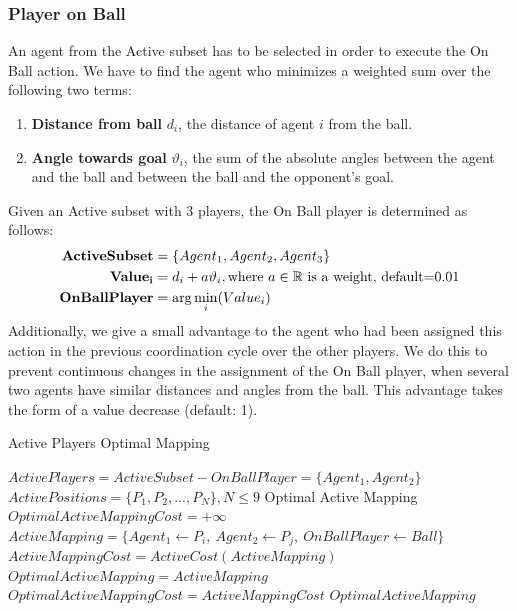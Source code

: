 \subsubsection*{Player on Ball}
An agent from the Active subset has to be selected in order to execute the On Ball action. We have to find the agent who minimizes a weighted sum over the following two terms:
\begin{enumerate}
\item \textbf{Distance from ball} $d_{i}$, the distance of agent $i$ from the ball. 
\item \textbf{Angle towards goal} $\vartheta_{i}$, the sum of the absolute angles between the agent and the ball and between the ball and the opponent's goal.
\end{enumerate}
Given an Active subset with 3 players, the On Ball player is determined as follows:
\begin{align*}
{\bf ActiveSubset} &= \lbrace Agent_{1},Agent_{2},Agent_{3} \rbrace  \\
{\bf Value_{i}} &= d_{i} + a \vartheta_{i}, \text{where $a\in\mathbb{R}$ is a weight, default=$0.01$} \\
{\bf OnBallPlayer} &= \arg\min_{i}(Value_{i})
\end{align*}
Additionally, we give a small advantage to the agent who had been assigned this action in the previous coordination cycle over the other players. We do this to prevent continuous changes in the assignment of the On Ball player, when several two agents have similar distances and angles from the ball. This advantage takes the form of a value decrease (default: 1).


\begin{algorithm}[t!]
\caption{Active Players Optimal Mapping}
\label{ActiveMapping}
\begin{algorithmic}[1]
$ActivePlayers = ActiveSubset - OnBallPlayer = \{Agent_1,Agent_2\}$
$ActivePositions = \lbrace P_{1},P_{2},...,P_{N} \rbrace, N\leq 9 $
Optimal Active Mapping
\STATE 
\STATE $OptimalActiveMappingCost = +\infty$
\STATE $ActiveMapping = \{Agent_1 \leftarrow P_i,\ Agent_2 \leftarrow P_j,\ OnBallPlayer \leftarrow Ball\}$
\STATE $ActiveMappingCost = ActiveCost(ActiveMapping)$
\STATE $OptimalActiveMapping = ActiveMapping$
\STATE $OptimalActiveMappingCost = ActiveMappingCost$
\ENDIF
\ENDFOR
\RETURN $OptimalActiveMapping$
\end{algorithmic}
\end{algorithm}




